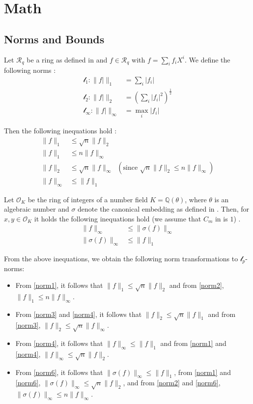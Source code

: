 \documentclass[
  a4paper,  %
  twoside,  %
  bibliography=totoc,
  headsepline,
  cleardoublepage=empty,
  parskip=half,
  draft=false
]{scrbook}
\begin{document}
\section{Math} 
\subsection{Norms and Bounds} %
Let $\mathcal{R}_q$ be a ring as defined in \cite{BDLOP18} and $f \in \mathcal{R}_q$ with $f = \sum_i f_i X^i$. We define the following norms \cite{BDLOP18}:
\begin{align}
  \mathcal{l}_1 : \| f| \|_1 &= \sum_i |f_i|\\
  \mathcal{l}_2 : \| f| \|_2 &= \left(\sum_i |f_i|^2\right) ^{\frac{1}{2}}\\
  \mathcal{l}_\infty : \| f| \|_\infty &= \max_i |f_i|
\end{align}

Then the following inequations hold \cite{BDLOP18}:
\begin{align}
  \| f \|_1 &\leq \sqrt{n} \| f \|_2 \label{norm1}\\
  \| f \|_1 &\leq n \| f \|_\infty \label{norm2}\\
  \| f \|_2 &\leq \sqrt{n} \| f \|_\infty \;\;(\text{since }  \sqrt{n} \| f \|_2 \leq n \| f \|_\infty) \label{norm3}\\
  \| f \|_\infty& \leq \| f \|_1 \label{norm4}
\end{align}

Let $\mathcal{O}_K$ be the ring of integers of a number field $K=\mathbb{Q}(\theta)$, where $\theta$ is an algebraic number and $\sigma$ denote the canonical embedding as defined in \cite{DPSZ12}. Then, for $x, y \in \mathcal{O}_K$ it holds the following inequations hold (we assume that $C_m$ in \cite{DPSZ12} is $1$) \cite{DPSZ12}. 
\begin{align}
  \| f \|_\infty &\leq \| \sigma(f) \|_\infty \label{norm5}\\
  \| \sigma(f) \|_\infty &\leq \| f \|_1 \label{norm6}
\end{align}

From the above inequations, we obtain the following norm transformations to $\mathcal{l}_p$-norms:
\begin{itemize}
  \item From \ref{norm1}, it follows that $\| f \|_1 \leq \sqrt{n} \| f \|_2$ and from \ref{norm2}, $\| f \|_1 \leq n \| f \|_\infty$.
  \item From \ref{norm3} and \ref{norm4}, it follows that $\| f \|_2 \leq \sqrt{n}  \| f \|_1$ and from \ref{norm3}, $\| f \|_2 \leq \sqrt{n}  \| f \|_\infty$.
  \item From \ref{norm4}, it follows that $\| f \|_\infty \leq  \| f \|_1$ and from \ref{norm1} and \ref{norm4}, $\| f \|_\infty \leq \sqrt{n}  \| f \|_2$.
  \item From \ref{norm6}, it follows that $\| \sigma(f) \|_\infty \leq  \| f \|_1$, from \ref{norm1} and \ref{norm6}, $\| \sigma(f) \|_\infty \leq \sqrt{n}  \| f \|_2$, and from \ref{norm2} and \ref{norm6}, $\| \sigma(f) \|_\infty \leq n  \| f \|_\infty$.
\end{itemize}
\end{document}
